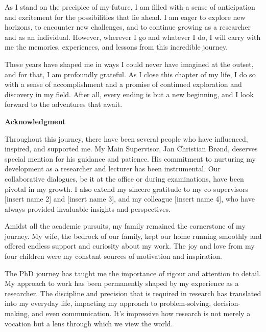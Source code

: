 \documentclass[
  9pt,
]{article}
\begin{document}
As I stand on the precipice of my future, I am filled with a sense of anticipation and excitement for the possibilities that lie ahead. I am eager to explore new horizons, to encounter new challenges, and to continue growing as a researcher and as an individual. However, wherever I go and whatever I do, I will carry with me the memories, experiences, and lessons from this incredible journey.

These years have shaped me in ways I could never have imagined at the outset, and for that, I am profoundly grateful. As I close this chapter of my life, I do so with a sense of accomplishment and a promise of continued exploration and discovery in my field. After all, every ending is but a new beginning, and I look forward to the adventures that await.

\newpage

  
\textsf{\textbf{\Large{Acknowledgment}}}

\vspace*{\baselineskip}

Throughout this journey, there have been several people who have influenced, inspired, and supported me. My Main Supervisor, Jan Christian Brønd, deserves special mention for his guidance and patience. His commitment to nurturing my development as a researcher and lecturer has been instrumental. Our collaborative dialogues, be it at the office or during examinations, have been pivotal in my growth. I also extend my sincere gratitude to my co-supervisors [insert name 2] and [insert name 3], and my colleague [insert name 4], who have always provided invaluable insights and perspectives.

Amidst all the academic pursuits, my family remained the cornerstone of my journey. My wife, the bedrock of our family, kept our home running smoothly and offered endless support and curiosity about my work. The joy and love from my four children were my constant sources of motivation and inspiration.

The PhD journey has taught me the importance of rigour and attention to detail. My approach to work has been permanently shaped by my experience as a researcher. The discipline and precision that is required in research has translated into my everyday life, impacting my approach to problem-solving, decision-making, and even communication. It's impressive how research is not merely a vocation but a lens through which we view the world.
\end{document}
